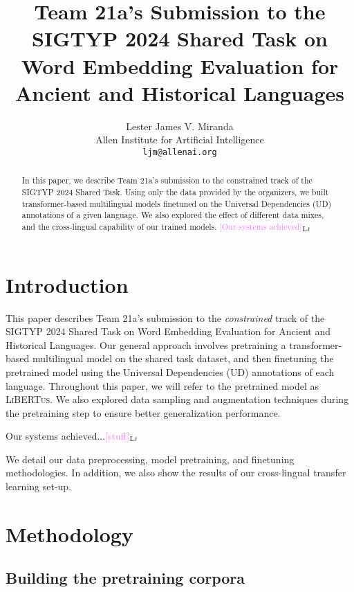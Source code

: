 \documentclass[11pt]{article}
\title{Team 21a's Submission to the SIGTYP 2024 Shared Task on Word Embedding Evaluation for Ancient and Historical Languages}
\author{Lester James V. Miranda \\
  Allen Institute for Artificial Intelligence \\
  \texttt{ljm@allenai.org} \\
}
\newcommand{\draftonly}[1]{#1}
\newcommand{\draftcomment}[3]{\draftonly{\textcolor{#2}{[#3]{$_{\textsc{#1}}$}}}}
\newcommand{\lj}[1]{\draftcomment{Lj}{violet}{#1}}
\newcommand{\libertus}{\textsc{LiBERTus}}
\begin{document}
\maketitle

\begin{abstract}
In this paper, we describe Team 21a's submission to the constrained track of the SIGTYP 2024 Shared Task.
Using only the data provided by the organizers, we built transformer-based multilingual models finetuned on the Universal Dependencies (UD) annotations of a given language.
We also explored the effect of different data mixes, and the cross-lingual capability of our trained models.
\lj{Our systems achieved}
\end{abstract}

\section{Introduction}
This paper describes Team 21a's submission to the \textit{constrained} track of the SIGTYP 2024 Shared Task on Word Embedding Evaluation for Ancient and Historical Languages.
Our general approach involves pretraining a transformer-based multilingual model on the shared task dataset, and then finetuning the pretrained model using the Universal Dependencies (UD) annotations of each language.
Throughout this paper, we will refer to the pretrained model as \libertus{}.
We also explored data sampling and augmentation techniques during the pretraining step to ensure better generalization performance.

Our systems achieved...\lj{stuff}

We detail our data preprocessing, model pretraining, and finetuning methodologies.
In addition, we also show the results of our cross-lingual transfer learning set-up.

\section{Methodology}

% 
% 


\subsection{Building the pretraining corpora}
\end{document}
